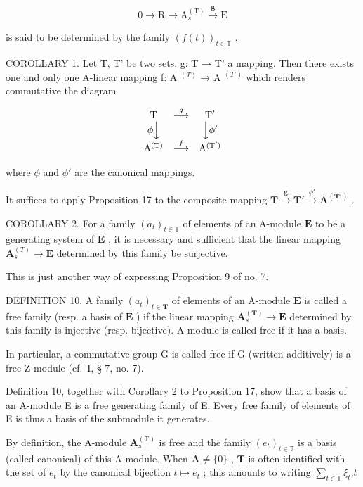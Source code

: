 \[
0 \longrightarrow \mathrm{R} \longrightarrow \mathrm{A} _ {s} ^ {(\mathrm{T})} \stackrel {\mathbf {g}} {\longrightarrow} \mathrm{E}\tag{44}
\]

is said to be determined by the family \((f(t))_{t\in\mathbb{T}}\) .

COROLLARY 1. Let T, T' be two sets, g: T → T' a mapping. Then there exists one and only one A-linear mapping f: A \(^{(T)}\) → A \(^{(T')}\) which renders commutative the diagram

\[
\begin{array}{c c c} \mathrm{T} & \stackrel {{g}} {{\longrightarrow}} & \mathrm{T} ^ {\prime} \\ \phi \Big \downarrow & & \Big \downarrow \phi^ {\prime} \\ \mathrm{A} ^ {(\mathrm{T})} & \stackrel {{f}} {{\longrightarrow}} & \mathrm{A} ^ {(\mathrm{T} ^ {\prime})} \end{array}
\]

where \(\phi\) and \(\phi'\) are the canonical mappings.

It suffices to apply Proposition 17 to the composite mapping \(\mathbf{T} \xrightarrow{\pmb{g}} \mathbf{T}' \xrightarrow{\phi'} \mathbf{A}^{(\mathbf{T}')}\) .

COROLLARY 2. For a family \((a_{t})_{t\in \mathbb{T}}\) of elements of an A-module \(\mathbf{E}\) to be a generating system of \(\mathbf{E}\) , it is necessary and sufficient that the linear mapping \(\mathbf{A}_{s}^{(T)}\to \mathbf{E}\) determined by this family be surjective.

This is just another way of expressing Proposition 9 of no. 7.

DEFINITION 10. A family \((a_{t})_{t\in \mathbf{T}}\) of elements of an A-module \(\mathbf{E}\) is called a free family (resp. a basis of \(\mathbf{E}\) ) if the linear mapping \(\mathbf{A}_{s}^{(\mathbf{T})}\to \mathbf{E}\) determined by this family is injective (resp. bijective). A module is called free if it has a basis.

In particular, a commutative group G is called free if G (written additively) is a free Z-module (cf.~I, § 7, no. 7).

Definition 10, together with Corollary 2 to Proposition 17, show that a basis of an A-module E is a free generating family of E. Every free family of elements of E is thus a basis of the submodule it generates.

By definition, the A-module \(\mathbf{A}_s^{(\mathrm{T})}\) is free and the family \((e_t)_{t\in \mathbb{T}}\) is a basis (called canonical) of this A-module. When \(\mathbf{A}\neq \{0\}\) , \(\mathbf{T}\) is often identified with the set of \(e_t\) by the canonical bijection \(t\mapsto e_t\) ; this amounts to writing \(\sum_{t\in \mathbb{T}}\xi_t.t\)

